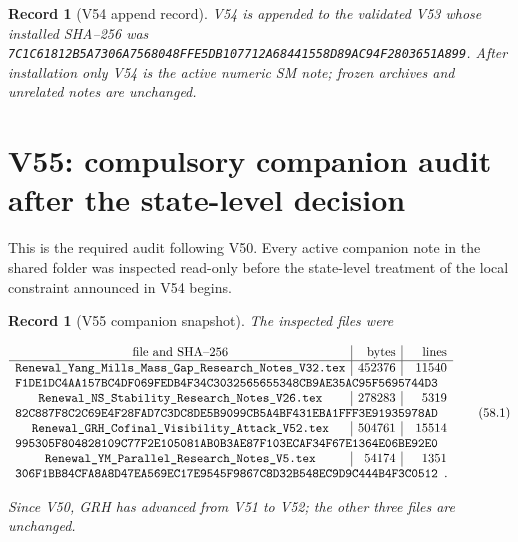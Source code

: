 \documentclass[11pt]{article}
\newtheorem{record}[theorem]{Record}
\theoremstyle{remark}
\begin{document}
\begin{record}[V54 append record]
\label{rec:v19v54}
V54 is appended to the validated V53 whose installed SHA--256 was
\texttt{7C1C61812B5A7306A7568048FFE5DB107712A68441558D89AC94F2803651A899}.
After installation only V54 is the active numeric SM note; frozen
archives and unrelated notes are unchanged.
\end{record}


\section{V55: compulsory companion audit after the state-level decision}
\label{sec:v19v55}

This is the required audit following V50.  Every active companion note
in the shared folder was inspected read-only before the state-level
treatment of the local constraint announced in V54 begins.

\begin{record}[V55 companion snapshot]
\label{rec:v19v55-snapshot}
The inspected files were

\[
\begin{array}{c|r|r}
\hbox{file and SHA--256}&\hbox{bytes}&\hbox{lines}\\ \hline
\texttt{Renewal\_Yang\_Mills\_Mass\_Gap\_Research\_Notes\_V32.tex}
&452376&11540\\
\multicolumn{3}{l}{
\texttt{F1DE1DC4AA157BC4DF069FEDB4F34C3032565655348CB9AE35AC95F5695744D3}}
\\
\texttt{Renewal\_NS\_Stability\_Research\_Notes\_V26.tex}
&278283&5319\\
\multicolumn{3}{l}{
\texttt{82C887F8C2C69E4F28FAD7C3DC8DE5B9099CB5A4BF431EBA1FFF3E91935978AD}}
\\
\texttt{Renewal\_GRH\_Cofinal\_Visibility\_Attack\_V52.tex}
&504761&15514\\
\multicolumn{3}{l}{
\texttt{995305F804828109C77F2E105081AB0B3AE87F103ECAF34F67E1364E06BE92E0}}
\\
\texttt{Renewal\_YM\_Parallel\_Research\_Notes\_V5.tex}
&54174&1351\\
\multicolumn{3}{l}{
\texttt{306F1BB84CFA8A8D47EA569EC17E9545F9867C8D32B548EC9D9C444B4F3C0512}}.
\end{array}                                                     \tag{58.1}
\]

Since V50, GRH has advanced from V51 to V52; the other three files are
unchanged.
\end{record}
\end{document}
